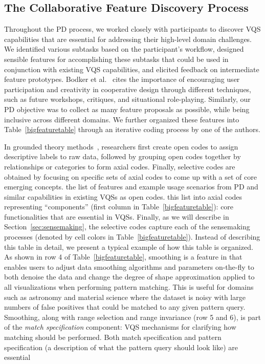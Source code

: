 {  \subsection{The Collaborative Feature Discovery Process~\label{sec:feature_dsicovery}}
  \par Throughout the PD process, we worked closely with participants to discover VQS capabilities that are essential for addressing their high-level domain challenges. We identified various subtasks based on the participant's workflow, designed sensible features for accomplishing these subtasks that could be used in conjunction with existing VQS capabilities, and elicited feedback on intermediate feature prototypes. Bodker et al.~\cite{BodkerGronbaek} cites the importance of encouraging user participation and creativity in cooperative design through different techniques, such as future workshops, critiques, and situational role-playing. Similarly, our PD objective was to collect as many feature proposals as possible, while being inclusive across different domains. We further organized these features into Table~\ref{bigfeaturetable} through an iterative coding process by one of the authors.
  \par In grounded theory methods~\cite{Muller2012}, researchers first create open codes to assign descriptive labels to raw data, followed by grouping open codes together by relationships or categories to form axial codes. Finally, selective codes are obtained by focusing on specific sets of axial codes to come up with a set of core emerging concepts.  the list of features and example usage scenarios from PD and similar capabilities in existing VQSs as open codes.  this list into axial codes representing ``components'' (first column in Table~\ref{bigfeaturetable}): core functionalities that are essential in VQSs. Finally, as we will describe in Section~\ref{sec:sensemaking}, the selective codes capture each of the sensemaking processes (denoted by cell colors in Table~\ref{bigfeaturetable}). Instead of describing this table in detail, we present a typical example of how this table is organized. As shown in row 4 of Table~\ref{bigfeaturetable}, smoothing is a feature in \zvpp that enables users to adjust data smoothing algorithms and parameters on-the-fly to both denoise the data and change the degree of shape approximation applied to all visualizations when performing pattern matching. This is useful for domains such as astronomy and material science where the dataset is noisy with large numbers of false positives that could be matched to any given pattern query. Smoothing, along with range selection and range invariance (row 5 and 6), is part of the \emph{match specification} component: VQS mechanisms for clarifying how matching should be performed. Both match specification and pattern specification (a description of what the pattern query should look like) are essential 
}
